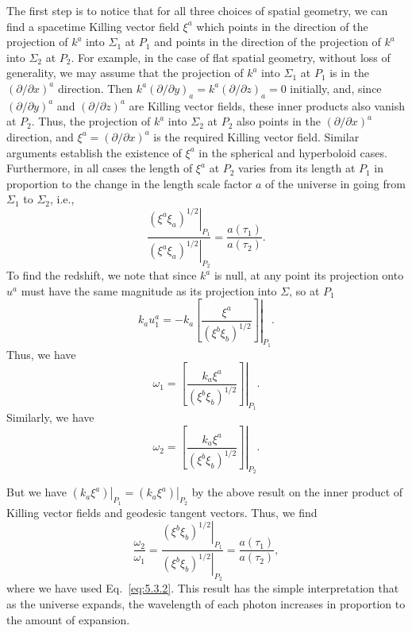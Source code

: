 The first step is to notice that for all three choices of spatial geometry, we can find
a spacetime Killing vector field \(\xi^a\) which points in the direction of the
projection of \(k^a\) into \(\Sigma_1\) at \(P_1\) and points in the direction of the
projection of \(k^a\) into \(\Sigma_2\) at \(P_2\). For example, in the case of flat
spatial geometry, without loss of generality, we may assume that the projection of
\(k^a\) into \(\Sigma_1\) at \(P_1\) is in the \((\partial/\partial x)^a\) direction.
Then \(k^a(\partial/\partial y)_a=k^a(\partial/\partial z)_a=0\) initially, and,
since \((\partial/\partial y)^a\) and \((\partial/\partial z)^a\) are Killing vector
fields, these inner products also vanish at \(P_2\). Thus, the projection of \(k^a\)
into \(\Sigma_2\) at \(P_2\) also points in the \((\partial/\partial x)^a\) direction,
and \(\xi^a=(\partial/\partial x)^a\) is the required Killing vector field. Similar
arguments establish the existence of \(\xi^a\) in the spherical and hyperboloid
cases. Furthermore, in all cases the length of \(\xi^a\) at \(P_2\) varies from its
length at \(P_1\) in proportion to the change in the length scale factor \(a\) of the
universe in going from \(\Sigma_1\) to \(\Sigma_2\), i.e.,
\begin{equation}
  \frac{\left.(\xi^a\xi_a)^{1/2}\right|_{P_1}}
       {\left.(\xi^a\xi_a)^{1/2}\right|_{P_2}}
  =\frac{a(\tau_1)}{a(\tau_2)}.
  \tag{5.3.2}\label{eq:5.3.2}
\end{equation}
To find the redshift, we note that since \(k^a\) is null, at any point its projection
onto \(u^a\) must have the same magnitude as its projection into \(\Sigma\), so at
\(P_1\)
\begin{equation}
  k_a u_1^a=-\left.k_a\left[\frac{\xi^a}{(\xi^b\xi_b)^{1/2}}\right]\right|_{P_1}.
  \tag{5.3.3}\label{eq:5.3.3}
\end{equation}
Thus, we have
\begin{equation}
  \omega_1=\left.\left[\frac{k_a\xi^a}{(\xi^b\xi_b)^{1/2}}\right]\right|_{P_1}.
  \tag{5.3.4}\label{eq:5.3.4}
\end{equation}
Similarly, we have
\begin{equation}
  \omega_2=\left.\left[\frac{k_a\xi^a}{(\xi^b\xi_b)^{1/2}}\right]\right|_{P_2}.
  \tag{5.3.5}\label{eq:5.3.5}
\end{equation}



But we have \(\left.(k_a\xi^a)\right|_{P_1}=\left.(k_a\xi^a)\right|_{P_2}\) by the
above result on the inner product of Killing vector fields and geodesic tangent
vectors. Thus, we find
\begin{equation}
  \frac{\omega_2}{\omega_1}
  =\frac{\left.(\xi^b\xi_b)^{1/2}\right|_{P_1}}
        {\left.(\xi^b\xi_b)^{1/2}\right|_{P_2}}
  =\frac{a(\tau_1)}{a(\tau_2)},
  \tag{5.3.6}\label{eq:5.3.6}
\end{equation}
where we have used Eq.~\eqref{eq:5.3.2}. This result has the simple interpretation
that as the universe expands, the wavelength of each photon increases in proportion to
the amount of expansion.

